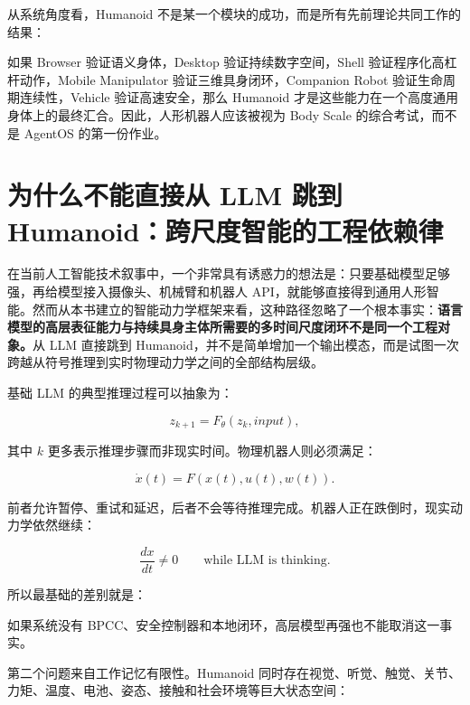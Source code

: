 从系统角度看，Humanoid 不是某一个模块的成功，而是所有先前理论共同工作的结果：

\begin{statementbox}
\centering
{}
\end{statementbox}

如果 Browser 验证语义身体，Desktop 验证持续数字空间，Shell 验证程序化高杠杆动作，Mobile Manipulator 验证三维具身闭环，Companion Robot 验证生命周期连续性，Vehicle 验证高速安全，那么 Humanoid 才是这些能力在一个高度通用身体上的最终汇合。因此，人形机器人应该被视为 Body Scale 的综合考试，而不是 AgentOS 的第一份作业。

\section{为什么不能直接从 LLM 跳到 Humanoid：跨尺度智能的工程依赖律}

在当前人工智能技术叙事中，一个非常具有诱惑力的想法是：只要基础模型足够强，再给模型接入摄像头、机械臂和机器人 API，就能够直接得到通用人形智能。然而从本书建立的智能动力学框架来看，这种路径忽略了一个根本事实：\textbf{语言模型的高层表征能力与持续具身主体所需要的多时间尺度闭环不是同一个工程对象。}从 LLM 直接跳到 Humanoid，并不是简单增加一个输出模态，而是试图一次跨越从符号推理到实时物理动力学之间的全部结构层级。

基础 LLM 的典型推理过程可以抽象为：

$$
z_{k+1}=F_{\theta}(z_k,input),
$$

其中 $k$ 更多表示推理步骤而非现实时间。物理机器人则必须满足：

$$
\dot x(t)=F(x(t),u(t),w(t)).
$$

前者允许暂停、重试和延迟，后者不会等待推理完成。机器人正在跌倒时，现实动力学依然继续：

$$
\frac{dx}{dt}\neq0
\qquad
\text{while LLM is thinking}.
$$

所以最基础的差别就是：

\begin{statementbox}
\centering
{}
\end{statementbox}

如果系统没有 BPCC、安全控制器和本地闭环，高层模型再强也不能取消这一事实。

第二个问题来自工作记忆有限性。Humanoid 同时存在视觉、听觉、触觉、关节、力矩、温度、电池、姿态、接触和社会环境等巨大状态空间：

